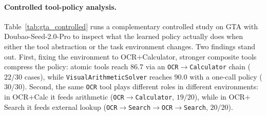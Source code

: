 \begin{table}[t]
\centering
\small
\setlength{\tabcolsep}{4pt}
\renewcommand{\arraystretch}{1.15}
\caption{%
  \textbf{GTA results: Base Agent, XSkill-style, and \sysname{} Mode~B on the 121-case
  validation split.} Accuracy (\%) per backbone; best per row in bold.
}
\label{tab:gta_detailed}
\end{table}

\paragraph{Controlled tool-policy analysis.}
Table~\ref{tab:gta_controlled} runs a complementary controlled study on GTA with
Doubao-Seed-2.0-Pro to inspect what the learned policy actually does when either the tool
abstraction or the task environment changes. Two findings stand out. First, fixing the
environment to OCR$+$Calculator, stronger composite tools compress the policy: atomic
tools reach $86.7$ via an \texttt{OCR}$\to$\texttt{Calculator} chain ($22/30$ cases),
while \texttt{VisualArithmeticSolver} reaches $90.0$ with a one-call policy ($30/30$).
Second, the same \texttt{OCR} tool plays different roles in different environments: in
OCR$+$Calc it feeds arithmetic (\texttt{OCR}$\to$\texttt{Calculator}, $19/20$), while in
OCR$+$Search it feeds external lookup
(\texttt{OCR}$\to$\texttt{Search}$\to$\texttt{OCR}$\to$\texttt{Search}, $20/20$).

